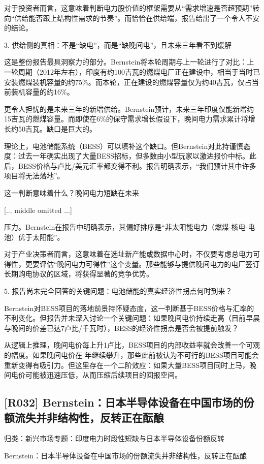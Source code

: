 \documentclass[11pt]{ctexart}
\begin{document}
对于投资者而言，这意味着判断电力股价值的框架需要从“需求增速是否超预期”转向“供给能否跟上结构性需求的节奏”。而恰恰在供给端，报告给出了一个令人不安的结论。

3. 供给侧的真相：不是“缺电”，而是“缺晚间电”，且未来三年看不到缓解

这是整份报告最具洞察力的部分。Bernstein将本轮周期与上一轮进行了对比：上一轮周期（2012年左右），印度有约100吉瓦的燃煤电厂正在建设中，相当于当时已安装燃煤装机容量的约75\%。而本轮，正在建设的燃煤容量仅为约40吉瓦，仅占当前装机容量的约16\%。

更令人担忧的是未来三年的新增供给。Bernstein预计，未来三年印度仅能新增约15吉瓦的燃煤容量。而即使在6\%的保守需求增长假设下，晚间电力需求累计将增长约50吉瓦。缺口是巨大的。

理论上，电池储能系统（BESS）可以填补这个缺口。但Bernstein对此持谨慎态度：过去一年确实出现了大量BESS招标，但多数由小型玩家以激进报价中标。此后，BESS价格与卢比/美元汇率都变得不利。报告明确表示，“我们预计其中许多项目将无法落地”。

这一判断意味着什么？晚间电力短缺在未来

[... middle omitted ...]

压力。Bernstein在报告中明确表示，其偏好排序是“非太阳能电力（燃煤-核电-电池）优于太阳能”。

对于产业决策者而言，这意味着在选址新产能或数据中心时，不仅要考虑总电力可得性，更要评估“晚间电力可得性”这个变量。那些能够与提供晚间电力的电厂签订长期购电协议的区域，将获得显著的竞争优势。

5. 报告尚未完全回答的关键问题：电池储能的真实经济性拐点何时到来？

Bernstein对BESS项目的落地前景持怀疑态度，这一判断基于BESS价格与汇率的不利变化。但报告并未深入讨论一个关键问题：如果晚间电价持续走高（目前早晨与晚间的价差已达7卢比/千瓦时），BESS的经济性拐点是否会被提前触发？

从逻辑上推理，晚间电价每上升1卢比，BESS项目的内部收益率就会改善一个可观的幅度。如果晚间电价在 年继续攀升，那些此前被认为不可行的BESS项目可能会重新变得有吸引力。但这里存在一个二阶效应：如果大量BESS项目同时上马，晚间电价可能被迅速压低，从而压缩后续项目的回报空间。

\subsection{[R032] Bernstein：日本半导体设备在中国市场的份额流失并非结构性，反转正在酝酿}
{\small\color{refgray}归类：新兴市场专题：印度电力时段性短缺与日本半导体设备份额反转}

Bernstein：日本半导体设备在中国市场的份额流失并非结构性，反转正在酝酿
\end{document}
